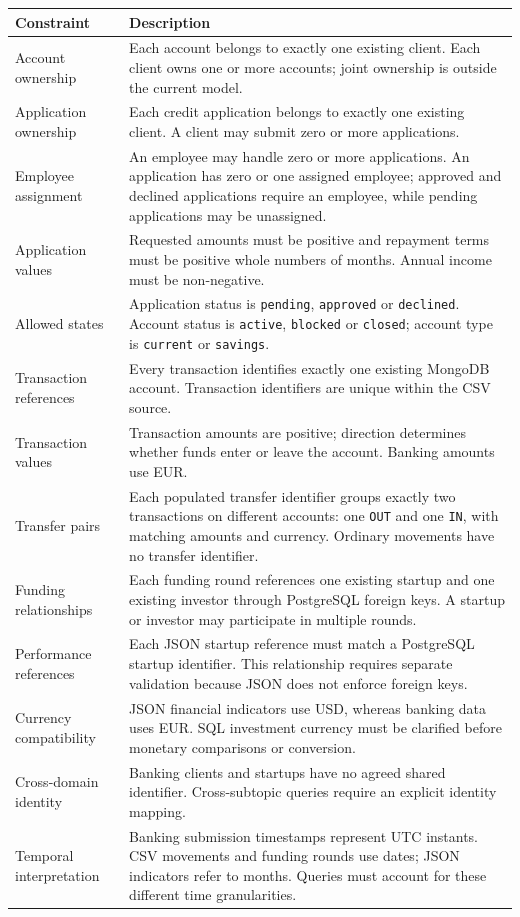 \documentclass[11pt,a4paper]{article}
\begin{document}
\begingroup
\renewcommand{\arraystretch}{1.2}
\begin{tabularx}{\textwidth}{@{}p{3.5cm} >{\raggedright\arraybackslash}X@{}}
\toprule
Constraint & Description\\
\midrule
Account ownership & Each account belongs to exactly one existing client. Each client owns one or more accounts; joint ownership is outside the current model.\\
Application ownership & Each credit application belongs to exactly one existing client. A client may submit zero or more applications.\\
Employee assignment & An employee may handle zero or more applications. An application has zero or one assigned employee; approved and declined applications require an employee, while pending applications may be unassigned.\\
Application values & Requested amounts must be positive and repayment terms must be positive whole numbers of months. Annual income must be non-negative.\\
Allowed states & Application status is \texttt{pending}, \texttt{approved} or \texttt{declined}. Account status is \texttt{active}, \texttt{blocked} or \texttt{closed}; account type is \texttt{current} or \texttt{savings}.\\
Transaction references & Every transaction identifies exactly one existing MongoDB account. Transaction identifiers are unique within the CSV source.\\
Transaction values & Transaction amounts are positive; direction determines whether funds enter or leave the account. Banking amounts use EUR.\\
Transfer pairs & Each populated transfer identifier groups exactly two transactions on different accounts: one \texttt{OUT} and one \texttt{IN}, with matching amounts and currency. Ordinary movements have no transfer identifier.\\
Funding relationships & Each funding round references one existing startup and one existing investor through PostgreSQL foreign keys. A startup or investor may participate in multiple rounds.\\
Performance references & Each JSON startup reference must match a PostgreSQL startup identifier. This relationship requires separate validation because JSON does not enforce foreign keys.\\
Currency compatibility & JSON financial indicators use USD, whereas banking data uses EUR. SQL investment currency must be clarified before monetary comparisons or conversion.\\
Cross-domain identity & Banking clients and startups have no agreed shared identifier. Cross-subtopic queries require an explicit identity mapping.\\
Temporal interpretation & Banking submission timestamps represent UTC instants. CSV movements and funding rounds use dates; JSON indicators refer to months. Queries must account for these different time granularities.\\
\bottomrule
\end{tabularx}
\endgroup
\end{document}
